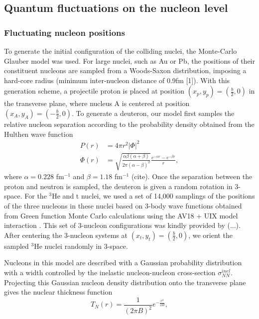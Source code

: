 \documentclass[preprint,showpacs,amsfonts,aps,prl,nofootinbib,floatfix]{revtex4}
\begin{document}
\subsection{Quantum fluctuations on the nucleon level}
\label{sec2a}
\subsubsection{Fluctuating nucleon positions}
\label{sec2a1}
To generate the initial configuration of the colliding nuclei, the Monte-Carlo Glauber model was used. For large nuclei, such as Au or Pb, the positions of their constituent nucleons are sampled from a Woods-Saxon distribution, imposing a hard-core radius (minimum inter-nucleon distance of 0.9fm [1]). With this generation scheme, a projectile proton is placed at position $(x_p,y_p)=(\frac{b}{2},0)$ in the transverse plane, where nucleus A is centered at position $(x_A,y_A)=(-\frac{b}{2},0)$. 
To generate a deuteron, our model first samples the relative nucleon separation according to the probability density obtained from the Hulthen wave function
\begin{align} 
\label{eq:HulthenPDF}
	P(r)&=4\pi r^2 |\Phi|^2\\
	\Phi(r)&=\sqrt{\frac{\alpha \beta(\alpha+\beta)}{2\pi(\alpha-\beta)^2}}\frac{e^{-\alpha r}-e^{-\beta r}}{r},
\end{align}
where $\alpha = 0.228$ fm$^{-1}$ and $\beta = 1.18$ fm$^{-1}$ (cite). Once the separation between the proton and neutron is sampled, the deuteron is given a random rotation in 3-space.
For the $^3$He and t nuclei, we used a set of 14,000 samplings of the positions of the three nucleons in these nuclei based on 3-body wave functions obtained from Green function Monte Carlo calculations using the AV18 + UIX model interaction \cite{Carlson:1997qn}. This set of 3-nucleon configurations was kindly provided by (...). After centering the 3-nucleon systems at $(x_t,y_t) = (\frac{b}{2},0)$, we orient the sampled $^3$He nuclei randomly in 3-space.

Nucleons in this model are described with a Gaussian probability distribution with a width controlled by the inelastic nucleon-nucleon cross-section $\sigma_{NN}^{inel}$. Projecting this Gaussian nucleon density distribution onto the transverse plane gives the nuclear thickness function \cite{Shen:2014vra}
\begin{equation} 
	T_{N}(r) = \frac{1}{(2\pi B)^2}e^{-\frac{r^2}{2B}},
\end{equation}
\end{document}
